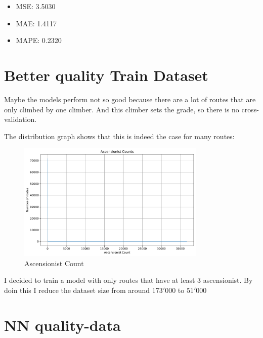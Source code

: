 \documentclass{article}
\begin{document}
\begin{itemize}
    \item MSE: 3.5030
    \item MAE: 1.4117
    \item MAPE: 0.2320
\end{itemize}


\section{Better quality  Train Dataset}
Maybe the models perform not so good because there are a lot of routes that are only climbed by one climber.
And this climber sets the grade, so there is no cross-validation. 

The distribution graph shows that this is indeed the case for many routes:

\begin{figure}[H]
    \centering    
    \includegraphics[width=0.8\textwidth]{../DataAnalysis/ascensionist_count.pdf}
    \caption{Ascensionist Count}\label{fig:asc_count}
\end{figure}

I decided to train a model with only routes that have at least 3 ascensionist.
By doin this I reduce the dataset size from around $173'000$ to $51'000$

\section{NN quality-data}
\end{document}
